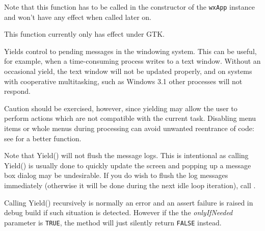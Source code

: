 Note that this function has to be called in the constructor of the {\tt wxApp} 
instance and won't have any effect when called later on.

This function currently only has effect under GTK.





Yields control to pending messages in the windowing system. This can be useful, for example, when a
time-consuming process writes to a text window. Without an occasional
yield, the text window will not be updated properly, and on systems with
cooperative multitasking, such as Windows 3.1 other processes will not respond.

Caution should be exercised, however, since yielding may allow the
user to perform actions which are not compatible with the current task.
Disabling menu items or whole menus during processing can avoid unwanted
reentrance of code: see  for a better
function.

Note that Yield() will not flush the message logs. This is intentional as
calling Yield() is usually done to quickly update the screen and popping up a
message box dialog may be undesirable. If you do wish to flush the log
messages immediately (otherwise it will be done during the next idle loop
iteration), call .

Calling Yield() recursively is normally an error and an assert failure is
raised in debug build if such situation is detected. However if the the 
{\it onlyIfNeeded} parameter is {\tt TRUE}, the method will just silently
return {\tt FALSE} instead.

